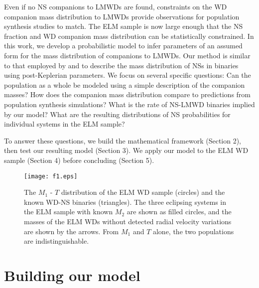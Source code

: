 \documentclass[apjl]{emulateapj}
\newcommand{\period}{T}
\begin{document}
Even if no NS companions to LMWDs are found, constraints on the WD companion mass distribution to LMWDs provide observations for population synthesis studies to match. 
The ELM sample is now large enough that the NS fraction and WD companion mass distribution can be statistically constrained. In this work, we develop a probabilistic model to infer parameters of an assumed form for the mass distribution of companions to LMWDs. Our method is similar to that employed by \citet{ozel12} and \citet{kiziltan13} to describe the mass distribution of NSs in binaries using post-Keplerian parameters. We focus on several specific questions: Can the population as a whole be modeled using a simple description of the companion masses? How does the companion mass distribution compare to predictions from population synthesis simulations?  What is the rate of NS-LMWD binaries implied by our model? What are the resulting distributions of NS probabilities for individual systems in the ELM sample? 

To answer these questions, we build the mathematical framework (Section 2), then test our resulting model (Section 3). We apply our model to the ELM WD sample (Section 4) before concluding (Section 5).

\begin{figure}[h!]
\begin{center}
\texttt{[image: f1.eps]}
\caption{The $M_1$ - $\period$ distribution of the ELM WD sample (circles) and the known WD-NS binaries (triangles). The three eclipsing systems in the ELM sample with known $M_2$ are shown as filled circles, and the masses of the ELM WDs without detected radial velocity variations are shown by the arrows. From $M_1$ and $\period$ alone, the two populations are indistinguishable.}
\label{fig:Porb-M1}
\end{center}
\end{figure}

\section{Building our model}
\end{document}
